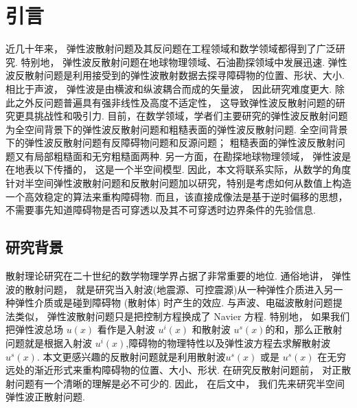 \chapter{引言}\label{chap:introduction}
近几十年来， 弹性波散射问题及其反问题在工程领域和数学领域都得到了广泛研究\cite{landau}.  特别地， 弹性波反散射问题在地球物理领域、石油勘探领域中发展迅速. 
弹性波反散射问题是利用接受到的弹性波散射数据去探寻障碍物的位置、形状、大小.  相比于声波， 弹性波是由横波和纵波耦合而成的矢量波， 因此研究难度更大.  除此之外反问题普遍具有强非线性及高度不适定性， 这导致弹性波反散射问题的研究更具挑战性和吸引力. 目前，在数学领域，学者们主要研究的弹性波反散射问题为全空间背景下的弹性波反散射问题\cite{bonnet2005inverse,bao2018inverse}和粗糙表面的弹性波反散射问题\cite{liu2019near}.  全空间背景下的弹性波反散射问题有反障碍物问题和反源问题； 粗糙表面的弹性波反散射问题又有局部粗糙面和无穷粗糙面两种. 另一方面，在勘探地球物理领域， 弹性波是在地表以下传播的， 这是一个半空间模型. 因此，本文将联系实际，从数学的角度针对半空间弹性波散射问题和反散射问题加以研究，特别是考虑如何从数值上构造一个高效稳定的算法来重构障碍物.  而且，该直接成像法是基于逆时偏移的思想，不需要事先知道障碍物是否可穿透以及其不可穿透时边界条件的先验信息. 
\section{研究背景}
 散射理论研究在二十世纪的数学物理学界占据了非常重要的地位. 通俗地讲， 弹性波的散射问题， 就是研究当入射波(地震源、可控震源)从一种弹性介质进入另一种弹性介质或是碰到障碍物 (散射体) 时产生的效应.  与声波、电磁波散射问题提法类似， 弹性波散射问题只是把控制方程换成了 Navier 方程. 特别地， 如果我们把弹性波总场 $u(x)$ 看作是入射波 $u^i(x)$ 和散射波 $u^s(x)$的和，那么正散射问题就是根据入射波 $u^i(x)$,障碍物的物理特性以及弹性波方程去求解散射波 $u^s(x)$.  本文更感兴趣的反散射问题就是利用散射波$u^s(x)$ 或是 $u^s(x)$ 在无穷远处的渐近形式来重构障碍物的位置、大小、形状. 在研究反散射问题前， 对正散射问题有一个清晰的理解是必不可少的. 因此， 在后文中， 我们先来研究半空间弹性波正散射问题. 
